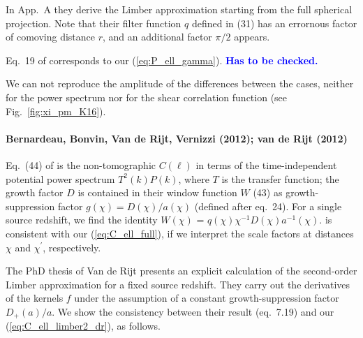 \documentclass[fleqn,usenatbib]{mnras} %
\newcommand{\mk}[1]{{\bf\textcolor{blue}{#1}}}
\begin{document}
\begin{appendix}
In App.~A they derive the Limber approximation starting from the full spherical
projection. Note that their filter function $q$ defined in (31) has an
errornous factor of comoving distance $r$, and an additional factor $\pi/2$
appears.

Eq.~19 of \cite{2016arXiv161104954K} corresponds to our
(\ref{eq:P_ell_gamma}). \mk{Has to be checked.}

We can not reproduce the amplitude of the differences between the cases, neither for
the power spectrum nor for the shear correlation function (see Fig.~\ref{fig:xi_pm_K16}).


\paragraph{Bernardeau, Bonvin, Van de Rijt, Vernizzi (2012); van de Rijt (2012)}

Eq.~(44) of \cite{2012PhRvD..86b3001B} is the non-tomographic $C(\ell)$ in
terms of the time-independent potential power spectrum $T^2(k) P(k)$, where $T$
is the transfer function; the growth factor $D$ is contained in their window
function $W$ (43) as growth-suppression factor $g(\chi) = D(\chi)/a(\chi)$
(defined after eq.~{24}). For a single source redshift, we find the identity
$W(\chi)$ = $q(\chi)\chi^{-1} D(\chi) a^{-1}(\chi)$.
\cite{2012PhRvD..86b3001B} is consistent with our
(\ref{eq:C_ell_full}), if we interpret the
scale factors at distances $\chi$ and $\chi^\prime$, respectively.

The PhD thesis of Van de Rijt \cite{vande2012} presents an explicit calculation
of the second-order Limber approximation for a fixed source redshift. They
carry out the derivatives of the kernels $f$ under the assumption of a constant
growth-suppression factor $D_+(a)/a$. We show the consistency between their
result (eq.~7.19) and our (\ref{eq:C_ell_limber2_dr}), as follows.


\end{appendix}
\end{document}

